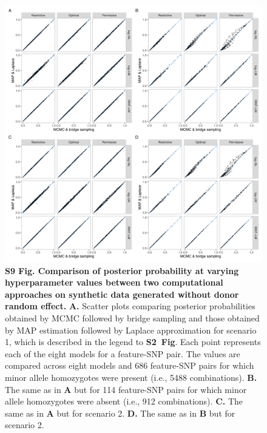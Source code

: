 \documentclass[11pt]{article}
\newcommand{\sfigroccmcmc}{\textbf{S2~Fig}\xspace}
\begin{document}
\begin{figure}[!ht]
\begin{center}
  \includegraphics[width=1\textwidth]{png/sim_compare_pp_noranef.png}
\end{center}  
\caption{
  {\bf
    S9 Fig.
    Comparison of posterior probability at varying hyperparameter values between two computational approaches on synthetic data generated without donor random effect.}
\textbf{A.} Scatter plots comparing posterior probabilities obtained by MCMC followed by bridge sampling and those obtained by MAP estimation followed by Laplace approximation for scenario 1, which is described in the legend to \sfigroccmcmc. Each point represents each of the eight models for a feature-SNP pair. The values are compared across eight models and 686 feature-SNP pairs for which minor allele homozygotes were present (i.e., 5488 combinations).
\textbf{B.} The same as in \textbf{A} but for 114 feature-SNP pairs for which minor allele homozygotes were absent (i.e., 912 combinations).
\textbf{C.} The same as in \textbf{A} but for scenario 2.
\textbf{D.} The same as in \textbf{B} but for scenario 2.
}
\label{s-fig:sim-compare-pp-noranef}
\end{figure}
\end{document}
